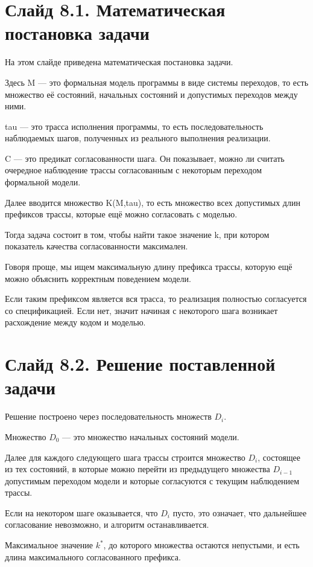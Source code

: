 \documentclass[12pt,a4paper]{article}
\begin{document}
\section*{Слайд 8.1. Математическая постановка задачи}

На этом слайде приведена математическая постановка задачи.

Здесь M — это формальная модель программы в виде системы
переходов, то есть множество её состояний, начальных состояний и
допустимых переходов между ними.

tau — это трасса исполнения программы, то есть последовательность
наблюдаемых шагов, полученных из реального выполнения реализации.

C — это предикат согласованности шага. Он показывает, можно ли
считать очередное наблюдение трассы согласованным с некоторым переходом
формальной модели.

Далее вводится множество K(M,tau), то есть множество
всех допустимых длин префиксов трассы, которые ещё можно согласовать с
моделью.

Тогда задача состоит в том, чтобы найти такое значение k, при
котором показатель качества согласованности максимален.

Говоря проще, мы ищем максимальную длину префикса трассы, которую ещё
можно объяснить корректным поведением модели.

Если таким префиксом является вся трасса, то реализация полностью
согласуется со спецификацией. Если нет, значит начиная с некоторого
шага возникает расхождение между кодом и моделью.

\section*{Слайд 8.2. Решение поставленной задачи}

Решение построено через последовательность множеств $D_i$.

Множество $D_0$ --- это множество начальных состояний модели.

Далее для каждого следующего шага трассы строится множество $D_i$,
состоящее из тех состояний, в которые можно перейти из предыдущего
множества $D_{i-1}$ допустимым переходом модели и которые
согласуются с текущим наблюдением трассы.

Если на некотором шаге оказывается, что $D_i$ пусто, это означает, что
дальнейшее согласование невозможно, и алгоритм останавливается.

Максимальное значение $k^*$, до которого множества остаются
непустыми, и есть длина максимального согласованного префикса.
\end{document}
